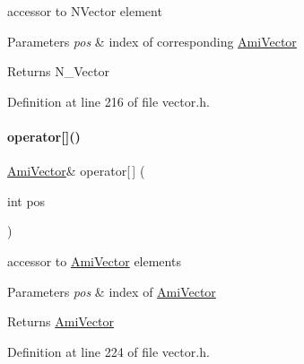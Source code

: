 accessor to N\+Vector element 
\begin{DoxyParams}{Parameters}
{\em pos} & index of corresponding \mbox{\hyperlink{classamici_1_1_ami_vector}{Ami\+Vector}} \\
\hline
\end{DoxyParams}
\begin{DoxyReturn}{Returns}
N\+\_\+\+Vector 
\end{DoxyReturn}


Definition at line 216 of file vector.\+h.

\mbox{\label{classamici_1_1_ami_vector_array_a337287b17e675970226a55ae63ad65a2}} 
\paragraph{\texorpdfstring{operator[]()}{operator[]()}\hspace{0.1cm}{\footnotesize\ttfamily [1/2]}}
{\footnotesize\ttfamily \mbox{\hyperlink{classamici_1_1_ami_vector}{Ami\+Vector}}\& operator\mbox{[}$\,$\mbox{]} (\begin{DoxyParamCaption}\item[{int}]{pos }\end{DoxyParamCaption})}

accessor to \mbox{\hyperlink{classamici_1_1_ami_vector}{Ami\+Vector}} elements 
\begin{DoxyParams}{Parameters}
{\em pos} & index of \mbox{\hyperlink{classamici_1_1_ami_vector}{Ami\+Vector}} \\
\hline
\end{DoxyParams}
\begin{DoxyReturn}{Returns}
\mbox{\hyperlink{classamici_1_1_ami_vector}{Ami\+Vector}} 
\end{DoxyReturn}


Definition at line 224 of file vector.\+h.

\mbox{\label{classamici_1_1_ami_vector_array_a45a615cf5e4b550783ee23560c834941}} 
